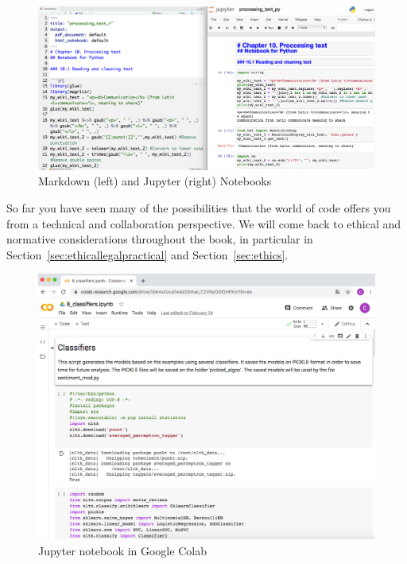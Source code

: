 \begin{figure}
\centering
\includegraphics[width=0.9\linewidth]{figures/ch04_notebooks}
\caption{Markdown (left) and Jupyter (right) Notebooks}
\label{fig:notebooks}
\end{figure}

So far you have seen many of the possibilities that the world of code offers you from a technical and collaboration perspective. We will come back to ethical and normative considerations throughout the book, in particular in Section~\ref{sec:ethicallegalpractical} and Section~\ref{sec:ethics}.

\begin{figure}
\centering
\includegraphics[width=0.9\linewidth]{figures/ch04_colab}
\caption{Jupyter notebook in Google Colab}
\label{fig:colab}
\end{figure}

